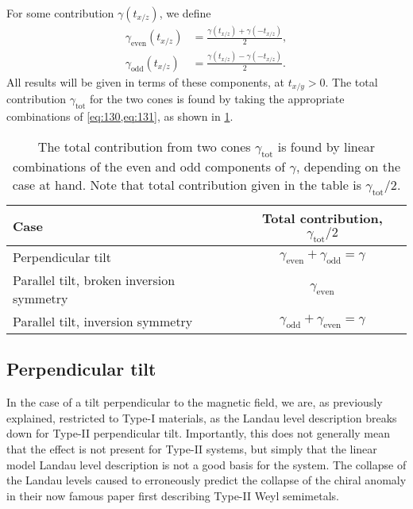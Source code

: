 For some contribution \( \gamma(t_{x /z}) \), we define
\begin{align}
  \gamma_{\text{even}}(t_{x/z}) &= \frac{\gamma(t_{x/z}) + \gamma(-t_{x/z})}{2}\label{eq:130},\\
  \gamma_{\text{odd}}(t_{x/z}) &= \frac{\gamma(t_{x/z}) - \gamma(-t_{x/z})}{2}\label{eq:131}.
\end{align}
All results will be given in terms of these components, at \( t_{x /y} > 0 \).
The total contribution \( \gamma_{\text{tot}} \) for the two cones is found by taking the appropriate combinations of \cref{eq:130,eq:131}, as shown in \cref{tab:gamma-tot}.

\begin{table}[h]
  \centering
  \begin{tabular}{l c}
    \toprule
    Case & Total contribution, \( \gamma_{\text{tot}} /2 \)\\
    \midrule
    Perpendicular tilt & \( \gamma_{\text{even}} + \gamma_{\text{odd}} = \gamma \)\\
    Parallel tilt, broken inversion symmetry & \( \gamma_{\text{even}} \)\\
    Parallel tilt, inversion symmetry &  \(  \gamma_{\text{odd}} + \gamma_{\text{even}} = \gamma \)\\\bottomrule
  \end{tabular}
  \caption{The total contribution from two cones \( \gamma_{\text{tot}} \) is found by linear combinations of the even and odd components of \( \gamma \), depending on the case at hand.
    Note that total contribution given in the table is \( \gamma_{\text{tot}} /2 \).
    \label{tab:gamma-tot}}
\end{table}

\subsection{Perpendicular tilt}
In the case of a tilt perpendicular to the magnetic field, we are, as previously explained, restricted to Type-I materials, as the Landau level description breaks down for Type-II perpendicular tilt.
Importantly, this does not generally mean that the effect is not present for Type-II systems, but simply that the linear model Landau level description is not a good basis for the system.
The collapse of the Landau levels caused \textcite{soluyanovTypeIIWeylSemimetals2015} to erroneously predict the collapse of the chiral anomaly in their now famous paper first describing Type-II Weyl semimetals.

